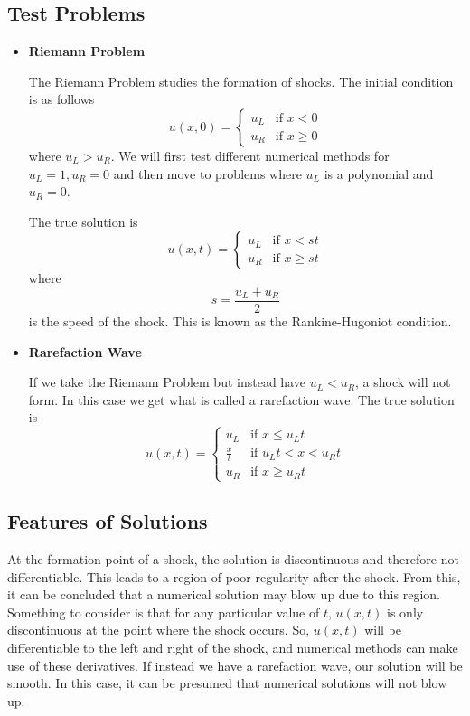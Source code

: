 \documentclass{myproject}
\begin{document}
\subsection{Test Problems}
\begin{itemize}
	\item \textbf{Riemann Problem}
	
    The Riemann Problem studies the formation of shocks. The initial condition is as follows
	\begin{equation}
		u(x,0) = 
	    \begin{cases}
	      	u_L & \text{if } x < 0 \\
			u_R & \text{if } x \geq 0
	    \end{cases}
	\end{equation}
	where $u_L > u_R$. We will first test different numerical methods for $u_L = 1, u_R = 0$ and then move to problems where $u_L$ is a polynomial and $u_R = 0$.
	
    The true solution is
	\begin{equation}
		u(x,t) = 
	    \begin{cases}
	      	u_L & \text{if } x < st \\
			u_R & \text{if } x \geq st
	    \end{cases}
	\end{equation}
	where \[s = \frac{u_L + u_R}{2}\] is the speed of the shock. This is known as the Rankine-Hugoniot condition.
	
	\item \textbf{Rarefaction Wave}
	
    If we take the Riemann Problem but instead have $u_L < u_R$, a shock will not form. In this case we get what is called a rarefaction wave.
	The true solution is
	\begin{equation}
		u(x,t) = 
	    \begin{cases}
	      	u_L & \text{if } x \leq {u_L}t \\
			\frac{x}{t} & \text{if } {u_L}t < x < {u_R}t \\
			u_R & \text{if } x \geq {u_R}t
	    \end{cases}
	\end{equation}
\end{itemize}

\subsection{Features of Solutions}
At the formation point of a shock, the solution is discontinuous and therefore not differentiable. This leads to a region of poor regularity after the shock. From this, it can be concluded that a numerical solution may blow up due to this region. Something to consider is that for any particular value of $t$, $u(x, t)$ is only discontinuous at the point where the shock occurs. So, $u(x,t)$ will be differentiable to the left and right of the shock, and numerical methods can make use of these derivatives. If instead we have a rarefaction wave, our solution will be smooth. In this case, it can be presumed that numerical solutions will not blow up.
\end{document}
